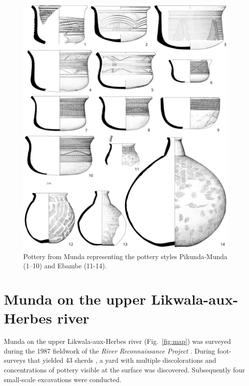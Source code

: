 \documentclass[a4paper]{article}
\begin{document}
\begin{figure}[H]
	\includegraphics[width=\textwidth]{Fig_Munda_PotterySampled.pdf}
	\caption{Pottery from Munda representing the pottery styles Pikunda-Munda (1--10) and Ebambe (11-14).}
	\label{fig:mun.pottery}
\end{figure}

\section{Munda on the upper Likwala-aux-Herbes river}

Munda on the upper Likwala-aux-Herbes river (Fig.~\ref{fig:map}) was surveyed during the 1987 fieldwork of the \textit{River Reconnaissance Project} \citep{Eggert.1992,Eggert.1993}. During foot-surveys that yielded 43 sherds \citep[349]{Seidensticker.2021e}, a yard with multiple discolorations and concentrations of pottery visible at the surface was discovered. Subsequently four small-scale excavations were conducted.
\end{document}
